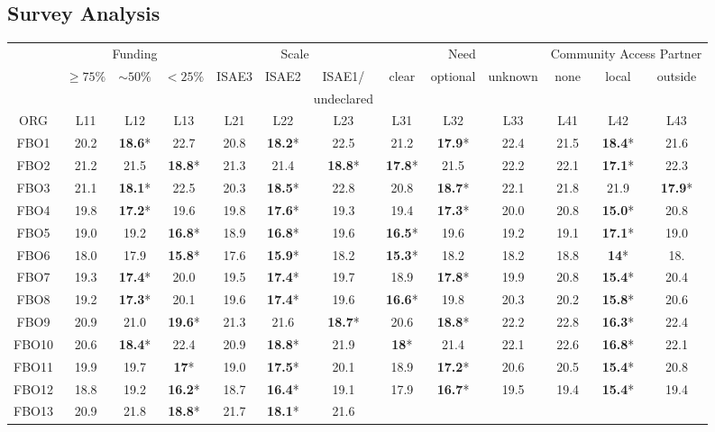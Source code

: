 \documentclass[a4paper, 12pt]{article}
\begin{document}
\subsection{Survey Analysis}
\begin{table}[!htpb]
	\centering
	\scriptsize
	\begin{tabular}{c|ccc|ccc|ccc|ccc}
		\multicolumn{1}{c}{}	&\multicolumn{3}{c}{Funding}&\multicolumn{3}{c}{Scale}&\multicolumn{3}{c}{Need}&\multicolumn{3}{c}{Community Access Partner}\\
		\multicolumn{1}{c}{}	&$\ge 75\%$&$\sim 50\%$&$<25 \%$& ISAE3&ISAE2& ISAE1/&clear&optional&unknown&none&local&outside\\
		\multicolumn{1}{c}{}	& & & & & & undeclared& & & & & & \\
		ORG & L11&L12&L13&L21&L22&L23&L31&L32&L33&L41&L42&L43\\\hline
FBO1 &20.2&{\bf 18.6}*&22.7&20.8&{\bf 18.2}*&22.5&  21.2&{\bf 17.9}*&22.4&21.5&{\bf 18.4}*&21.6\\
FBO2 &21.2&21.5&{\bf 18.8}*&21.3&21.4&{\bf 18.8}*&  {\bf 17.8}*&21.5&22.2&22.1&{\bf 17.1}*&22.3\\
FBO3 &21.1&{\bf 18.1}*&22.5&20.3&{\bf 18.5}*&22.8&   20.8&{\bf 18.7}*&22.1&21.8&21.9&{\bf 17.9}*\\
FBO4 &19.8&
{\bf 17.2}*&19.6&19.8&{\bf 17.6}*&19.3&19.4&{\bf 17.3}*&
20.0&20.8&{\bf 15.0}*&20.8
\\
FBO5 &19.0&19.2&{\bf 16.8}*&18.9&{\bf 16.8}*&19.6&
{\bf 16.5}*&19.6&19.2&19.1&{\bf 17.1}*&19.0\\
FBO6 &18.0& 17.9&{\bf 15.8}*&17.6&{\bf 15.9}*&
18.2&{\bf 15.3}*&18.2&18.2&18.8&{\bf 14}*&18.\\
FBO7 &19.3&{\bf 17.4}*&20.0&19.5&{\bf 17.4}*&
19.7&18.9&{\bf 17.8}*&19.9&20.8&{\bf 15.4}*&20.4\\
FBO8 &19.2&{\bf 17.3}*&20.1&19.6&{\bf 17.4}*&
19.6&{\bf 16.6}*&19.8&20.3&20.2&{\bf 15.8}*&20.6\\
FBO9 & 20.9&21.0&{\bf 19.6}*&21.3&21.6&
{\bf 18.7}*&20.6&{\bf 18.8}*&22.2&22.8&{\bf 16.3}*&22.4\\
FBO10&20.6&{\bf 18.4}*&22.4&20.9&{\bf 18.8}*&
21.9&{\bf 18}*&21.4&22.1&22.6&{\bf 16.8}*&22.1\\
FBO11&19.9&19.7&{\bf 17}*&19.0&{\bf 17.5}*&20.1&
18.9&{\bf 17.2}*&20.6&20.5&{\bf 15.4}*&20.8\\
FBO12&18.8&19.2&{\bf 16.2}*&18.7&{\bf 16.4}*&
19.1&17.9&{\bf 16.7}*&19.5&19.4&{\bf 15.4}*&19.4\\
FBO13&20.9&21.8&{\bf 18.8}*&21.7&{\bf 18.1}*&21.6&

\end{tabular}
\end{table}
\end{document}
